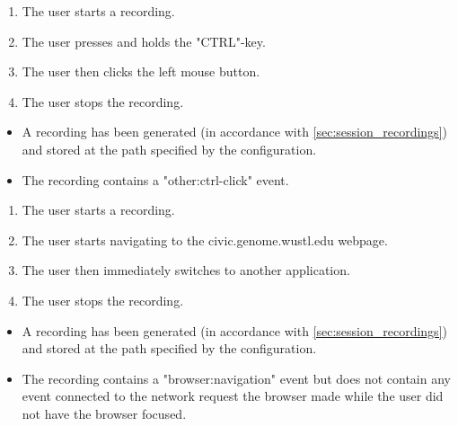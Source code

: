 \begin{tests}
    {\begin{enumerate}
        \item The \gls{user} starts a recording.
        \item The \gls{user} presses and holds the "CTRL"-key.
        \item The \gls{user} then clicks the left mouse button.
        \item The \gls{user} stops the recording.
    \end{enumerate}}
    {\begin{itemize}
        \item A recording has been generated (in accordance with \ref{sec:session_recordings}) and stored at the path specified by the configuration.
        \item The recording contains a "other:ctrl-click" event.
    \end{itemize}}

    {\begin{enumerate}
        \item The \gls{user} starts a recording.
        \item The \gls{user} starts navigating to the civic.genome.wustl.edu webpage.
        \item The \gls{user} then immediately switches to another application.
        \item The \gls{user} stops the recording.
    \end{enumerate}}
    {\begin{itemize}
        \item A recording has been generated (in accordance with \ref{sec:session_recordings}) and stored at the path specified by the configuration.
        \item The recording contains a "browser:navigation" event but does not contain any event connected to the network request the browser made while the \gls{user} did not have the browser focused.
    \end{itemize}}
\end{tests}

